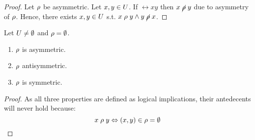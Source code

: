 \begin{proof}
  Let $\rho$ be asymmetric. Let $x, y \in U$.
  If $\rel{x}{y}$ then $x\mathrel{\cancel{\rho}}y$ due to asymmetry of $\rho$.
  Hence, there exists $x, y \in U$ s.t. $x\mathrel{\rho}y \land y\mathrel{\cancel{\rho}}x$.

\end{proof}

\begin{claim}
  Let $U \neq \emptyset$ and $\rho = \emptyset$.

  \begin{enumerate}
    \item $\rho$ is asymmetric.
    \item $\rho$ antisymmetric.
    \item $\rho$ is symmetric.
  \end{enumerate}
\end{claim}

\begin{proof}
  As all three properties are defined as logical implications, their antedecents will never hold because:
  \[
    x\mathrel{\rho}y \Leftrightarrow (x, y) \in \rho = \emptyset
  \]
\end{proof}

